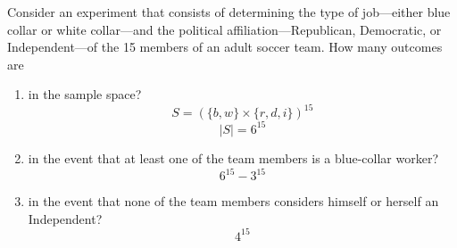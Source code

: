 \item  Consider an experiment that consists of determining the type of job—either blue collar or white collar—and the political affiliation—Republican, Democratic, or Independent—of the 15 members of an adult soccer team. How many outcomes are
\begin{enumerate}
    \item in the sample space?
    \[
        S = (\{b, w\} \times \{r, d, i\})^{15}
    \]
    \[ |S| = 6^{15} \]
    \item in the event that at least one of the team members is a blue-collar worker?
    \[ 6^{15} - 3^{15} \]
    \item in the event that none of the team members considers himself or herself an Independent?
    \[ 4^{15} \]
\end{enumerate}